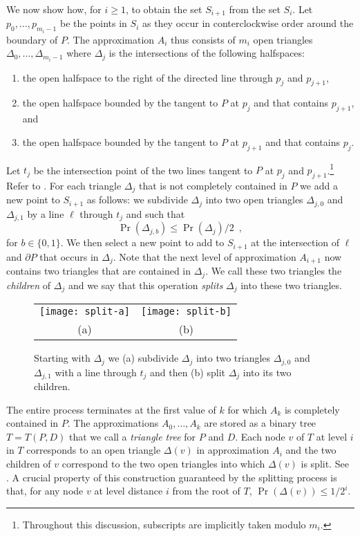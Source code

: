\documentclass[charterfonts,lotsofwhite]{patmorin}
\newcommand{\boundary}{\partial}
\begin{document}
We now show how, for $i\ge 1$, to obtain the set $S_{i+1}$ from the
set $S_{i}$.  Let $p_0,\ldots,p_{m_i-1}$ be the points in $S_i$ as
they occur in conterclockwise order around the boundary of $P$.  The
approximation $A_i$ thus consists of $m_i$ open triangles
$\Delta_0,\ldots,\Delta_{m_i-1}$ where $\Delta_j$ is the intersections
of the following halfspaces:

\begin{enumerate}
\item the open halfspace to the right of the directed line through 
	$p_j$ and $p_{j+1}$,
\item the open halfspace bounded by the tangent to $P$ at $p_j$ and that
contains $p_{j+1}$, and 
\item the open halfspace bounded by the tangent to $P$ at $p_{j+1}$ and
that contains $p_j$.
\end{enumerate}
Let $t_j$ be the intersection point of 
the two lines tangent to $P$ at $p_j$ and
$p_{j+1}$.\footnote{Throughout this discussion, subscripts are
implicitly taken modulo $m_i$.}  Refer to . For each
triangle $\Delta_j$ that is not completely contained in $P$
we add a new point to
$S_{i+1}$ as follows:  we subdivide $\Delta_j$ into two open triangles
$\Delta_{j,0}$ and $\Delta_{j,1}$ by a line $\ell$ through $t_j$ and
such that 
\[  
     \Pr(\Delta_{j,b}) \le \Pr(\Delta_{j})/2 \enspace ,
\]
for $b\in\{0,1\}$.
We then select a new point to add to $S_{i+1}$ at the intersection of
$\ell$ and $\boundary P$ that occurs in $\Delta_j$.  Note that the
next level of approximation $A_{i+1}$ now contains two triangles that
are contained in $\Delta_j$.  We call these two triangles the
\emph{children} of $\Delta_j$ and we say that this operation
\emph{splits} $\Delta_j$ into these two triangles.

\begin{figure}
\begin{center}
\begin{tabular}{cc}
\texttt{[image: split-a]} & \texttt{[image: split-b]} \\
(a) & (b)
\end{tabular}
\end{center}
\caption{Starting with $\Delta_j$ we (a) subdivide $\Delta_j$ into two triangles
$\Delta_{j,0}$ and $\Delta_{j,1}$ with a line through $t_j$ and then
(b) split $\Delta_j$ into its two children.}
\end{figure}

The entire process terminates at the first value of $k$ for which
$A_k$ is completely contained in $P$.  The approximations
$A_0,\ldots,A_k$ are stored as a binary tree $T=T(P,D)$ that we call a
\emph{triangle tree} for $P$ and $D$.  Each node $v$ of $T$ at level
$i$ in $T$ corresponds to an open triangle $\Delta(v)$ in
approximation $A_{i}$ and the two children of $v$ correspond to the
two open triangles into which $\Delta(v)$ is split. See .
A crucial property of this construction guaranteed by the splitting
process is that, for any node $v$ at level distance $i$ from the root
of $T$, $\Pr(\Delta(v))\le 1/2^i$.
\end{document}
